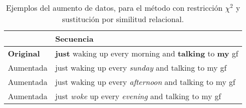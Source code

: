 \begin{table}[hbt!]
\caption{Ejemplos del aumento de datos, para el método con restricción $\chi^2$ y sustitución por similitud relacional.} 
\label{table:ejemplos_xi}
\centering
\begin{tabular}{ll}
\hline
                  & \textbf{Secuencia}                                                        \\ \hline
\textbf{Original} & \textbf{just} waking up every morning and \textbf{talking} to \textbf{my} gf \\ \hline
Aumentada         & just waking up every \textit{sunday} and talking to my gf \\ \hline
Aumentada         & just waking up every \textit{afternoon} and talking to my gf \\ \hline
Aumentada         & just \textit{woke} up every \textit{evening} and talking to my gf  \\ \hline
\end{tabular}

\end{table}